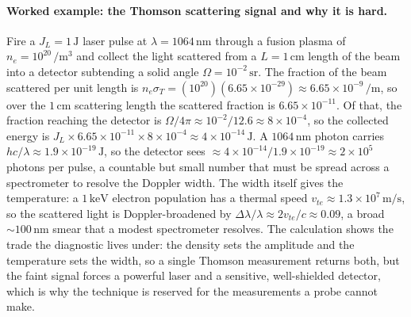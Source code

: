 \paragraph{Worked example: the Thomson scattering signal and why it is hard.}
Fire a $J_L = 1\,\si{\joule}$ laser pulse at $\lambda = 1064\,\si{\nano\meter}$
through a fusion plasma of $n_e = 10^{20}\,\si{\per\meter\cubed}$ and collect
the light scattered from a $L = 1\,\si{\centi\meter}$ length of the beam into a
detector subtending a solid angle $\Omega = 10^{-2}\,\si{\steradian}$. The
fraction of the beam scattered per unit length is $n_e\sigma_T = (10^{20})
(6.65\times 10^{-29}) \approx 6.65\times 10^{-9}\,\si{\per\meter}$, so over the
$1\,\si{\centi\meter}$ scattering length the scattered fraction is $6.65\times
10^{-11}$. Of that, the fraction reaching the detector is $\Omega/4\pi \approx
10^{-2}/12.6 \approx 8\times 10^{-4}$, so the collected energy is $J_L\times
6.65\times 10^{-11}\times 8\times 10^{-4} \approx 4\times 10^{-14}\,\si{\joule}$.
A $1064\,\si{\nano\meter}$ photon carries $hc/\lambda \approx 1.9\times
10^{-19}\,\si{\joule}$, so the detector sees $\approx 4\times 10^{-14}/1.9
\times 10^{-19} \approx 2\times 10^{5}$ photons per pulse, a countable but small
number that must be spread across a spectrometer to resolve the Doppler width.
The width itself gives the temperature: a $1\,\si{\kilo\electronvolt}$ electron
population has a thermal speed $v_{te} \approx 1.3\times 10^{7}\,\si{\meter\per
\second}$, so the scattered light is Doppler-broadened by $\Delta\lambda/\lambda
\approx 2v_{te}/c \approx 0.09$, a broad $\sim 100\,\si{\nano\meter}$ smear that
a modest spectrometer resolves. The calculation shows the trade the diagnostic
lives under: the density sets the amplitude and the temperature sets the width,
so a single Thomson measurement returns both, but the faint signal forces a
powerful laser and a sensitive, well-shielded detector, which is why the
technique is reserved for the measurements a probe cannot make.



